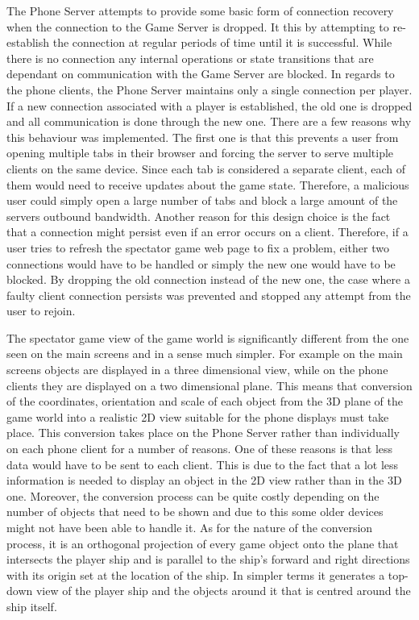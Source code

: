 \documentclass[a4paper,11pt]{article}
\begin{document}
The Phone Server attempts to provide some basic form of connection recovery when the connection to the Game Server is dropped. It this by attempting to re-establish the connection at regular periods of time until it is successful. While there is no connection any internal operations or state transitions that are dependant on communication with the Game Server are blocked. In regards to the phone clients, the Phone Server maintains only a single connection per player. If a new connection associated with a player is established, the old one is dropped and all communication is done through the new one. There are a few reasons why this behaviour was implemented. The first one is that this prevents a user from opening multiple tabs in their browser and forcing the server to serve multiple clients on the same device. Since each tab is considered a separate client, each of them would need to receive updates about the game state. Therefore, a malicious user could simply open a large number of tabs and block a large amount of the servers outbound bandwidth. Another reason for this design choice is the fact that a connection might persist even if an error occurs on a client. Therefore, if a user tries to refresh the spectator game web page to fix a problem, either two connections would have to be handled or simply the new one would have to be blocked. By dropping the old connection instead of the new one, the case where a faulty client connection persists was prevented and stopped any attempt from the user to rejoin.

The spectator game view of the game world is significantly different from the one seen on the main screens and in a sense much simpler. For example on the main screens objects are displayed in a three dimensional view, while on the phone clients they are displayed on a two dimensional plane. This means that conversion of the coordinates, orientation and scale of each object from the 3D plane of the game world into a realistic 2D view suitable for the phone displays must take place. This conversion takes place on the Phone Server rather than individually on each phone client for a number of reasons. One of these reasons is that less data would have to be sent to each client. This is due to the fact that a lot less information is needed to display an object in the 2D view rather than in the 3D one. Moreover, the conversion process can be quite costly depending on the number of objects that need to be shown and due to this some older devices might not have been able to handle it. As for the nature of the conversion process, it is an orthogonal projection of every game object onto the plane that intersects the player ship and is parallel to the ship's forward and right directions with its origin set at the location of the ship. In simpler terms it generates a top-down view of the player ship and the objects around it that is centred around the ship itself.
\end{document}
